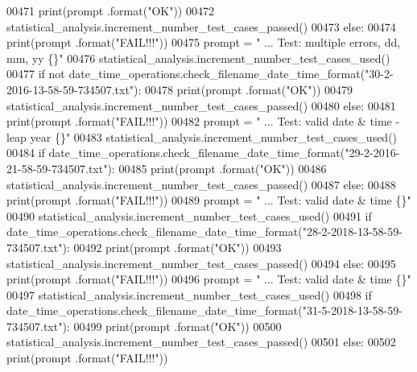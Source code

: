 \begin{DoxyCode}
00471             print(prompt .format(\textcolor{stringliteral}{"OK"}))
00472             statistical\_analysis.increment\_number\_test\_cases\_passed()
00473         \textcolor{keywordflow}{else}:
00474             print(prompt .format(\textcolor{stringliteral}{"FAIL!!!"}))
00475         prompt = \textcolor{stringliteral}{"  ... Test: multiple errors, dd, mm, yy           \{\}"}
00476         statistical\_analysis.increment\_number\_test\_cases\_used()
00477         \textcolor{keywordflow}{if} \textcolor{keywordflow}{not} date\_time\_operations.check\_filename\_date\_time\_format(\textcolor{stringliteral}{"30-2-2016-13-58-59-734507.txt"}):
00478             print(prompt .format(\textcolor{stringliteral}{"OK"}))
00479             statistical\_analysis.increment\_number\_test\_cases\_passed()
00480         \textcolor{keywordflow}{else}:
00481             print(prompt .format(\textcolor{stringliteral}{"FAIL!!!"}))
00482         prompt = \textcolor{stringliteral}{"  ... Test: valid date & time - leap year         \{\}"}
00483         statistical\_analysis.increment\_number\_test\_cases\_used()
00484         \textcolor{keywordflow}{if} date\_time\_operations.check\_filename\_date\_time\_format(\textcolor{stringliteral}{"29-2-2016-21-58-59-734507.txt"}):
00485             print(prompt .format(\textcolor{stringliteral}{"OK"}))
00486             statistical\_analysis.increment\_number\_test\_cases\_passed()
00487         \textcolor{keywordflow}{else}:
00488             print(prompt .format(\textcolor{stringliteral}{"FAIL!!!"}))
00489         prompt = \textcolor{stringliteral}{"  ... Test: valid date & time             \{\}"}
00490         statistical\_analysis.increment\_number\_test\_cases\_used()
00491         \textcolor{keywordflow}{if} date\_time\_operations.check\_filename\_date\_time\_format(\textcolor{stringliteral}{"28-2-2018-13-58-59-734507.txt"}):
00492             print(prompt .format(\textcolor{stringliteral}{"OK"}))
00493             statistical\_analysis.increment\_number\_test\_cases\_passed()
00494         \textcolor{keywordflow}{else}:
00495             print(prompt .format(\textcolor{stringliteral}{"FAIL!!!"}))
00496         prompt = \textcolor{stringliteral}{"  ... Test: valid date & time             \{\}"}
00497         statistical\_analysis.increment\_number\_test\_cases\_used()
00498         \textcolor{keywordflow}{if} date\_time\_operations.check\_filename\_date\_time\_format(\textcolor{stringliteral}{"31-5-2018-13-58-59-734507.txt"}):
00499             print(prompt .format(\textcolor{stringliteral}{"OK"}))
00500             statistical\_analysis.increment\_number\_test\_cases\_passed()
00501         \textcolor{keywordflow}{else}:
00502             print(prompt .format(\textcolor{stringliteral}{"FAIL!!!"}))
\end{DoxyCode}

